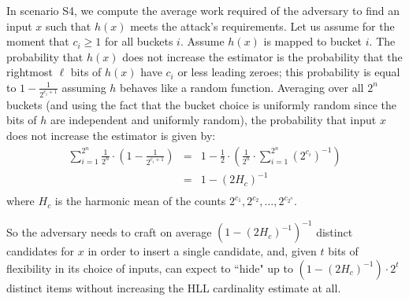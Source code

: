 \documentclass{IEEEtran}
\begin{document}
In scenario S4, we compute the average work required of the adversary to find an input $x$ such that $h(x)$ meets the attack's requirements. Let us assume for the moment that $c_i \ge 1$ for all buckets $i$. Assume $h(x)$ is mapped to bucket $i$. The probability that $h(x)$ does not increase the estimator is the probability that the  rightmost $\ell$ bits of $h(x)$ have $c_i$ or less leading zeroes; this probability is equal to $1-\frac{1}{2^{c_i+1}}$ assuming $h$ behaves like a random function. Averaging over all $2^n$ buckets (and using the fact that the bucket choice is uniformly random since the bits of $h$ are independent and uniformly random), the probability that input $x$ does not increase the estimator is given by:
\begin{eqnarray*}
\sum_{i=1}^{2^n}\frac{1}{2^n} \cdot (1-\frac{1}{2^{c_i+1}}) & = & 1-\frac{1}{2}\cdot (\frac{1}{2^n}\cdot \sum_{i=1}^{2^n} {(2^{c_i})}^{-1}) \\
& = &1-(2H_c)^{-1} \\
\end{eqnarray*}
where $H_c$ is the harmonic mean of the counts $2^{c_1}, 2^{c_2}, \ldots, 2^{c_{2^n}}$.

So the adversary needs to craft on average $(1-(2H_c)^{-1})^{-1}$ distinct candidates for $x$ in order to insert a single candidate, and, given $t$ bits of flexibility in its choice of inputs, can expect to ``hide" up to $(1-(2H_c)^{-1}) \cdot 2^t$ distinct items without increasing the HLL cardinality estimate at all.

\end{document}
